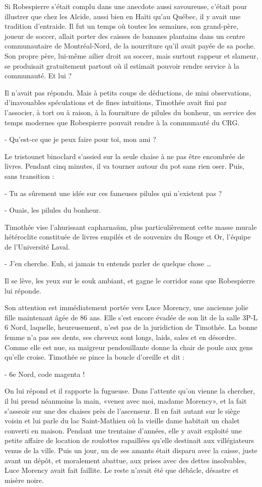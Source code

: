 Si Robespierre s’était complu dans une anecdote aussi savoureuse, c’était pour illustrer que chez les Alcide, aussi bien en Haïti qu’au Québec, il y avait une tradition d’entraide. Il fut un temps où toutes les semaines, son grand-père, joueur de soccer, allait porter des caisses de bananes plantains dans un centre communautaire de Montréal-Nord, de la nourriture qu’il avait payée de sa poche. Son propre père, lui-même ailier droit au soccer, mais surtout rappeur et slameur, se produisait gratuitement partout où il estimait pouvoir rendre service à la communauté. Et lui ?

Il n’avait pas répondu. Mais à petits coups de déductions, de mini observations, d’inavouables spéculations et de fines intuitions, Timothée avait fini par l’associer, à tort ou à raison, à la fourniture de pilules du bonheur, un service des temps modernes que Robespierre pouvait rendre à la communauté du CRG.

- Qu’est-ce que je peux faire pour toi, mon ami ?

Le tristounet binoclard s’assied sur la seule chaise à ne pas être encombrée de livres. Pendant cinq minutes, il va tourner autour du pot sans rien oser. Puis, sans transition :

- Tu as sûrement une idée sur ces fameuses pilules qui n’existent pas ?

- Ouais, les pilules du bonheur.

Timothée vise l’ahurissant capharnaüm, plus particulièrement cette masse murale hétéroclite constituée de livres empilés et de souvenirs du Rouge et Or, l’équipe de l’Université Laval.

- J’en cherche. Euh, si jamais tu entends parler de quelque chose …

Il se lève, les yeux sur le souk ambiant, et gagne le corridor sans que Robespierre lui réponde.

Son attention est immédiatement portée vers Luce Morency, une ancienne jolie fille maintenant âgée de 86 ans. Elle s’est encore évadée de son lit de la salle 3P-L 6 Nord, laquelle, heureusement, n’est pas de la juridiction de Timothée. La bonne femme n’a pas ses dents, ses cheveux sont longs, laids, sales et en désordre. Comme elle est nue, sa maigreur pendouillante donne la chair de poule aux gens qu’elle croise. Timothée se pince la boucle d’oreille et dit :

- 6e Nord, code magenta !

On lui répond et il rapporte la fugueuse. Dans l’attente qu’on vienne la chercher, il lui prend néanmoins la main, «venez avec moi, madame Morency», et la fait s’asseoir sur une des chaises près de l’ascenseur. Il en fait autant sur le siège voisin et lui parle du lac Saint-Mathieu où la vieille dame habitait un chalet converti en maison. Pendant une trentaine d’années, elle y avait exploité une petite affaire de location de roulottes rapaillées qu’elle destinait aux villégiateurs venus de la ville. Puis un jour, un de ses amants était disparu avec la caisse, juste avant un dépôt, et moralement abattue, aux prises avec des dettes insolvables, Luce Morency avait fait faillite. Le reste n’avait été que débâcle, désastre et misère noire.

